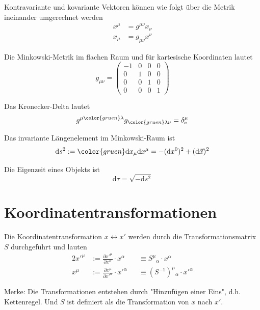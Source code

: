 \documentclass{article}
\newcommand{\diff}{\mathrm{d}}
\begin{document}
Kontravariante und kovariante Vektoren können wie folgt über die Metrik ineinander umgerechnet werden
	\begin{align}
		x^\mu &= g^{\mu\nu} x_\nu \\
		x_\mu &= g_{\mu\nu} x^\nu
	\end{align}

Die Minkowski-Metrik im flachen Raum und für kartesische Koordinaten lautet
	\begin{equation}
		g_{\mu\nu} = 
		\begin{pmatrix}
			-1 & 0 & 0 & 0 \\
			0 & 1 & 0 & 0 \\
			0 & 0 & 1 & 0 \\
			0 & 0 & 0 & 1
		\end{pmatrix}
	\end{equation}

Das Kronecker-Delta lautet
	\begin{equation}
		g^{\mu{\color{gruen}\lambda}} g_{{\color{gruen}\lambda}\nu} = \delta^\mu_\nu
	\end{equation}

Das invariante Längenelement im Minkowski-Raum ist
	\begin{equation}
		\diff s^2 := {\color{gruen} \diff x_\mu \diff x^\mu} = -(\diff x^0)^2 + (\diff \vec{x})^2
	\end{equation}

Die Eigenzeit eines Objekts ist
	\begin{equation}
		\diff \tau = \sqrt{-\diff s^2}
	\end{equation}


\newpage


\section{Koordinatentransformationen}
Die Koordinatentransformation $x \leftrightarrow x'$ werden durch die Transformationsmatrix $S$ durchgeführt und lauten
	\begin{alignat}{2}
		x'^\mu &:= \frac{\partial x'^\mu}{\partial x^\alpha} \cdot x^\alpha &&\equiv  S^\mu{}_\alpha \cdot x^\alpha\\
		x^\mu &:= \frac{\partial x^\mu}{\partial x'^\alpha} \cdot x'^\alpha &&\equiv (S^{-1})^\mu{}_\alpha \cdot x'^\alpha
	\end{alignat}

\textcolor{gruen}{Merke: Die Transformationen entstehen durch "Hinzufügen einer Eins", d.h. Kettenregel. Und $S$ ist definiert als die Transformation von $x$ nach $x'$.}
\end{document}
